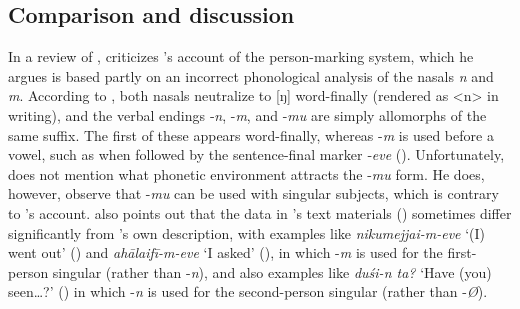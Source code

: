 \documentclass[output=paper]{langsci/langscibook}
\begin{document}
\begin{table}
\caption{Person suffixes according to \cite{CainGair2000}}
\label{tab:jl3}	
\end{table}

\subsection{Comparison and discussion}\label{s:jl2-3}

In a review of \cite{Fritz2002}, \cite{Cain2004} criticizes \citeauthor{Fritz2002}’s account of the person-marking system, which he argues is based partly on an incorrect phonological analysis of the nasals \textit{n} and \textit{m}. According to \citeauthor{Cain2004}, both nasals neutralize to [ŋ] word-finally (rendered as <n> in writing), and the verbal endings ‑\textit{n}, -\textit{m}, and \mbox{-\textit{mu}} are simply allomorphs of the same suffix. The first of these appears word-finally, whereas -\textit{m} is used before a vowel, such as when followed by the sentence-final marker ‑\textit{eve} (\citealt[355]{Cain2004}). Unfortunately, \citeauthor{Cain2004} does not mention what phonetic environment attracts the \mbox{-\textit{mu}} form. He does, however, observe that -\textit{mu} can be used with singular subjects, which is contrary to \citeauthor{Fritz2002}’s account. \citeauthor{Cain2004} also points out that the data in \citeauthor{Fritz2002}’s text materials (\citealt[Vol. 2]{Fritz2002}) sometimes differ significantly from \citeauthor{Fritz2002}’s own description, with examples like \textit{nikumejjai-m-eve} ‘(I) went out’ (\citeyear[Vol. 2, 136]{Fritz2002}) and \textit{ahālaifī-m-eve} ‘I asked’ (\citeyear[Vol. 2, 141]{Fritz2002}), in which -\textit{m} is used for the first-person singular (rather than -\textit{n}), and also examples like \textit{duśi-n ta?} ‘Have (you) seen…?’ (\citeyear[(Vol. 2) 154]{Fritz2002}) in which -\textit{n} is used for the second-person singular (rather than -\textit{Ø}). 
\end{document}
